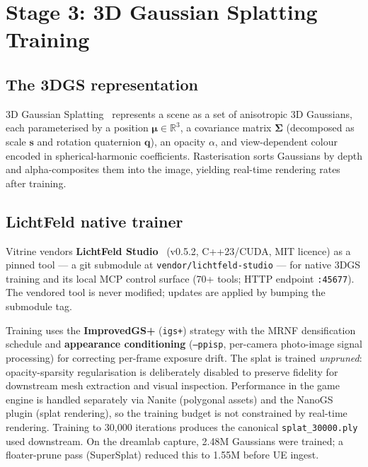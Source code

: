 \section{Stage 3: 3D Gaussian Splatting Training}
\label{sec:method:3dgs}

\subsection{The 3DGS representation}
3D Gaussian Splatting~\cite{kerbl2023_3dgs} represents a scene as a set of anisotropic
3D Gaussians, each parameterised by a position $\boldsymbol{\mu} \in \mathbb{R}^3$, a
covariance matrix $\boldsymbol{\Sigma}$ (decomposed as scale $\mathbf{s}$ and rotation
quaternion $\mathbf{q}$), an opacity $\alpha$, and view-dependent colour encoded in
spherical-harmonic coefficients.  Rasterisation sorts Gaussians by depth and
alpha-composites them into the image, yielding real-time rendering rates after training.

\subsection{LichtFeld native trainer}
Vitrine vendors \textbf{LichtFeld Studio}~\cite{lichtfeld2026} (v0.5.2,
C++23/CUDA, MIT licence) as a pinned tool --- a git submodule at
\texttt{vendor/lichtfeld-studio} --- for native 3DGS training and its local MCP control
surface (70+ tools; HTTP endpoint \texttt{:45677}).  The vendored tool is never modified;
updates are applied by bumping the submodule tag.

Training uses the \textbf{ImprovedGS+} (\texttt{igs+}) strategy with the MRNF
densification schedule and \textbf{appearance conditioning} (\texttt{--ppisp},
per-camera photo-image signal processing) for correcting per-frame exposure drift.  The
splat is trained \emph{unpruned}: opacity-sparsity regularisation is deliberately
disabled to preserve fidelity for downstream mesh extraction and visual inspection.
Performance in the game engine is handled separately via Nanite (polygonal assets) and
the NanoGS plugin (splat rendering), so the training budget is not constrained by
real-time rendering.  Training to 30,000 iterations produces the canonical
\texttt{splat\_30000.ply} used downstream.  On the dreamlab capture, 2.48M Gaussians were
trained; a floater-prune pass (SuperSplat) reduced this to 1.55M before UE ingest.

